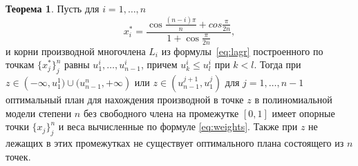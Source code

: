 \documentclass[specialist,
               substylefile = spbu.rtx,
               subf,href,colorlinks=true, 12pt]{disser}
\theoremstyle{definition}
\newtheorem{theorem}{Теорема}
\begin{document}
	\begin{theorem}
	\label{th1}
		Пусть для $i = 1, \ldots, n$ 
		\begin{equation}
			\label{eq:th1:points}
			x_i^* = \frac{\cos \frac{(n - i) \pi}{n} + cos \frac{\pi}{2n}}{1 + \cos \frac{\pi}{2n}} ,
		\end{equation}
		и корни производной многочлена $L_i$ из формулы~\eqref{eq:lagr} построенного по точкам $\{x_j^*\}_j^n$ равны $u_1^i, \ldots, u_{n-1}^i$, причем $u_k^i \leqslant u_l^i$ при $k < l$. Тогда при $z \in \left(-\infty, u_1^1) \cup (u_{n-1}^n, +\infty \right)$ или $z \in \left( u_{n-1}^{j+1}, u_1^{j} \right)$ для $j=1, \ldots, n-1$ оптимальный план для нахождения производной в точке $z$ в полиномиальной модели степени $n$ без свободного члена на промежутке $[0, 1]$ имеет опорные точки $\{x_j\}_j^n$ и веса вычисленные по формуле \eqref{eq:weights}. Также при $z$ не лежащих в этих промежутках не существует оптимального плана состоящего из $n$ точек.
	\end{theorem}
\end{document}
